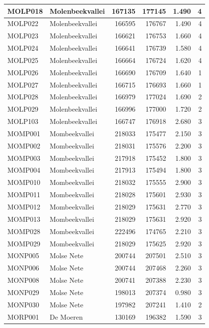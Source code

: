 \documentclass[11pt,]{book}
\begin{document}
\begin{table}
\begin{tabular}[t]{l|l|r|r|r|r}
\hline
MOLP018 & Molenbeekvallei & 167135 & 177145 & 1.490 & 4\\
\hline
MOLP022 & Molenbeekvallei & 166595 & 176767 & 1.490 & 4\\
\hline
MOLP023 & Molenbeekvallei & 166621 & 176753 & 1.660 & 4\\
\hline
MOLP024 & Molenbeekvallei & 166641 & 176739 & 1.580 & 4\\
\hline
MOLP025 & Molenbeekvallei & 166664 & 176724 & 1.620 & 4\\
\hline
MOLP026 & Molenbeekvallei & 166690 & 176709 & 1.640 & 1\\
\hline
MOLP027 & Molenbeekvallei & 166715 & 176693 & 1.660 & 1\\
\hline
MOLP028 & Molenbeekvallei & 166979 & 177024 & 1.690 & 2\\
\hline
MOLP029 & Molenbeekvallei & 166996 & 177000 & 1.720 & 2\\
\hline
MOLP103 & Molenbeekvallei & 166747 & 176918 & 2.680 & 3\\
\hline
MOMP001 & Mombeekvallei & 218033 & 175477 & 2.150 & 3\\
\hline
MOMP002 & Mombeekvallei & 218031 & 175576 & 2.200 & 3\\
\hline
MOMP003 & Mombeekvallei & 217918 & 175452 & 1.800 & 3\\
\hline
MOMP004 & Mombeekvallei & 217913 & 175494 & 1.800 & 3\\
\hline
MOMP010 & Mombeekvallei & 218032 & 175555 & 2.900 & 3\\
\hline
MOMP011 & Mombeekvallei & 218028 & 175601 & 2.930 & 3\\
\hline
MOMP012 & Mombeekvallei & 218029 & 175631 & 2.770 & 3\\
\hline
MOMP013 & Mombeekvallei & 218029 & 175631 & 2.920 & 3\\
\hline
MOMP028 & Mombeekvallei & 222496 & 174765 & 2.210 & 3\\
\hline
MOMP029 & Mombeekvallei & 218029 & 175625 & 2.920 & 3\\
\hline
MONP005 & Molse Nete & 200744 & 207501 & 2.510 & 3\\
\hline
MONP006 & Molse Nete & 200744 & 207468 & 2.260 & 3\\
\hline
MONP008 & Molse Nete & 200741 & 207388 & 2.230 & 3\\
\hline
MONP029 & Molse Nete & 198013 & 207374 & 0.980 & 3\\
\hline
MONP030 & Molse Nete & 197982 & 207241 & 1.410 & 2\\
\hline
MORP001 & De Moeren & 130169 & 196382 & 1.590 & 3\\

\end{tabular}
\end{table}
\end{document}
